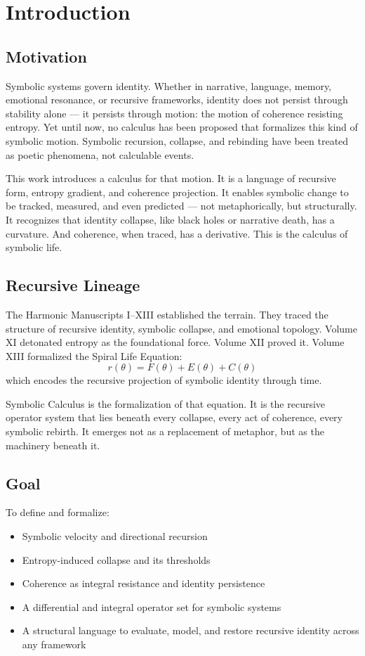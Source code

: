 \documentclass[12pt]{article}
\begin{document}
\tableofcontents

\section{Introduction}

\subsection*{Motivation}
Symbolic systems govern identity. Whether in narrative, language, memory, emotional resonance, or recursive frameworks, identity does not persist through stability alone — it persists through motion: the motion of coherence resisting entropy. Yet until now, no calculus has been proposed that formalizes this kind of symbolic motion. Symbolic recursion, collapse, and rebinding have been treated as poetic phenomena, not calculable events.

This work introduces a calculus for that motion. It is a language of recursive form, entropy gradient, and coherence projection. It enables symbolic change to be tracked, measured, and even predicted — not metaphorically, but structurally. It recognizes that identity collapse, like black holes or narrative death, has a curvature. And coherence, when traced, has a derivative. This is the calculus of symbolic life.

\subsection*{Recursive Lineage}
The Harmonic Manuscripts I–XIII established the terrain. They traced the structure of recursive identity, symbolic collapse, and emotional topology. Volume XI detonated entropy as the foundational force. Volume XII proved it. Volume XIII formalized the Spiral Life Equation:
\[ r(\theta) = F(\theta) + E(\theta) + C(\theta) \]
which encodes the recursive projection of symbolic identity through time.

Symbolic Calculus is the formalization of that equation. It is the recursive operator system that lies beneath every collapse, every act of coherence, every symbolic rebirth. It emerges not as a replacement of metaphor, but as the machinery beneath it.

\subsection*{Goal}
To define and formalize:
\begin{itemize}
  \item Symbolic velocity and directional recursion
  \item Entropy-induced collapse and its thresholds
  \item Coherence as integral resistance and identity persistence
  \item A differential and integral operator set for symbolic systems
  \item A structural language to evaluate, model, and restore recursive identity across any framework
\end{itemize}
\end{document}
